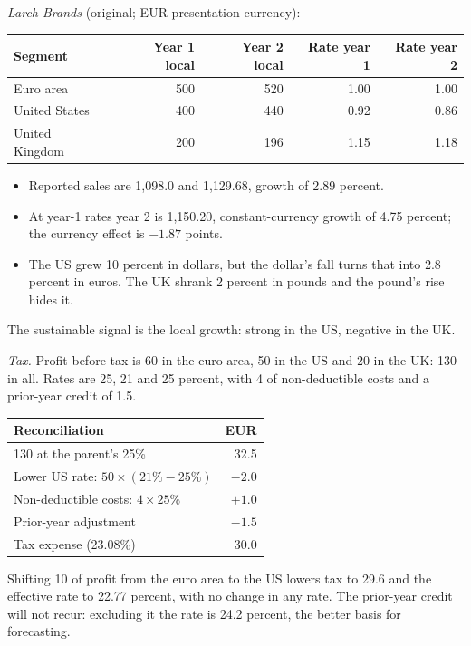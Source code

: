 \begin{qfmethod}
 \emph{Larch Brands} (original; EUR presentation currency):
\begin{center}\small
\begin{tabular}{@{}lrrrr@{}}
\toprule
Segment & Year 1 local & Year 2 local & Rate year 1 & Rate year 2 \\
\midrule
Euro area & 500 & 520 & 1.00 & 1.00 \\
United States & 400 & 440 & 0.92 & 0.86 \\
United Kingdom & 200 & 196 & 1.15 & 1.18 \\
\bottomrule
\end{tabular}
\end{center}
\begin{itemize}
\item Reported sales are 1,098.0 and 1,129.68, growth of 2.89 percent.
\item At year-1 rates year 2 is 1,150.20, constant-currency growth of 4.75 percent; the currency effect is $-1.87$ points.
\item The US grew 10 percent in dollars, but the dollar's fall turns that into 2.8 percent in euros. The UK shrank 2 percent in pounds and the pound's rise hides it.
\end{itemize}
The sustainable signal is the local growth: strong in the US, negative in the UK.

\emph{Tax.} Profit before tax is 60 in the euro area, 50 in the US and 20 in the UK: 130 in all. Rates are 25, 21 and 25 percent, with 4 of non-deductible costs and a prior-year credit of 1.5.
\begin{center}\small
\begin{tabular}{@{}lr@{}}
\toprule
Reconciliation & EUR \\
\midrule
130 at the parent's 25\% & 32.5 \\
Lower US rate: $50\times(21\%-25\%)$ & $-2.0$ \\
Non-deductible costs: $4\times25\%$ & $+1.0$ \\
Prior-year adjustment & $-1.5$ \\
\midrule
Tax expense (23.08\%) & 30.0 \\
\bottomrule
\end{tabular}
\end{center}
Shifting 10 of profit from the euro area to the US lowers tax to 29.6 and the effective rate to 22.77 percent, with no change in any rate. The prior-year credit will not recur: excluding it the rate is 24.2 percent, the better basis for forecasting.


\end{qfmethod}

